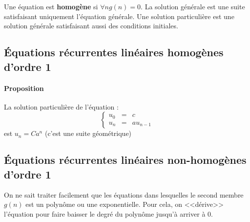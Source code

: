 	Une équation est \textbf{homogène} si $\forall n g(n) = 0$. La solution générale est une suite satisfaisant uniquement l'équation générale. Une
	solution particulière est une solution générale satisfaisant aussi des conditions initiales.

	\subsection{Équations récurrentes linéaires homogènes d'ordre 1}
	\paragraph{Proposition} La solution particulière de l'équation : 
	\begin{displaymath}
		\left\{ \begin{array}{lll}
			u_0 &=& c\\
			u_n &=&  a u_{n-1}
		\end{array} \right.
	\end{displaymath}
	est $u_n=C a^n$ (c'est une suite géométrique)

	\subsection{Équations récurrentes linéaires non-homogènes d'ordre 1}
	On ne sait traiter facilement que les équations dans lesquelles le second membre $g(n)$ est un polynôme ou une exponentielle. Pour cela, on
	<<dérive>> l'équation pour faire baisser le degré du polynôme jusqu'à arriver à 0.


